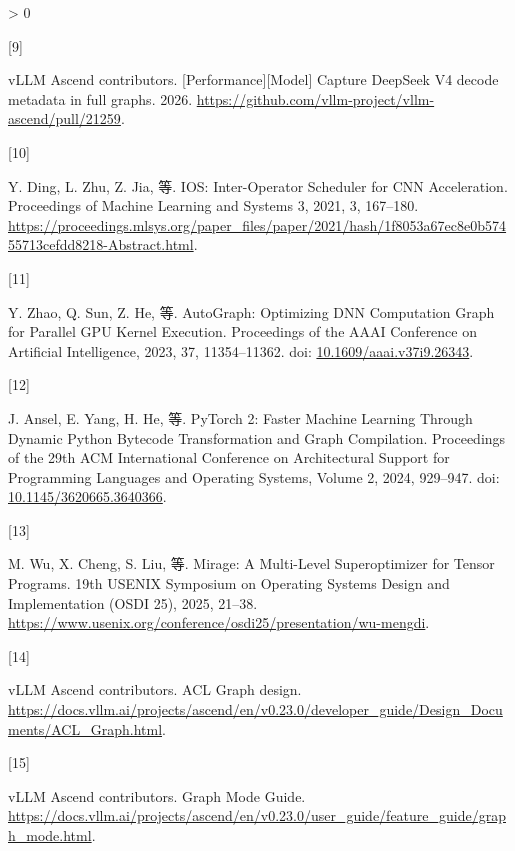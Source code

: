 \documentclass[
  UTF8,
  zihao=5]{ctexart}
\newlength{\cslhangindent}
\newlength{\csllabelwidth}
\newenvironment{CSLReferences}[2] %
 {%
  \setlength{\parindent}{0pt}
  \ifodd #1 \everypar{\setlength{\hangindent}{\cslhangindent}}\ignorespaces\fi
  \ifnum #2 > 0
  \setlength{\parskip}{#2\baselineskip}
  \fi
 }%
 {}
\newcommand{\CSLLeftMargin}[1]{\parbox[t]{\csllabelwidth}{#1}}
\newcommand{\CSLRightInline}[1]{\parbox[t]{\linewidth - \csllabelwidth}{#1}\par}
\begin{document}
\begin{CSLReferences}{0}{0}
\leavevmode{}%
\CSLLeftMargin{{[}9{]} }%
\CSLRightInline{vLLM Ascend contributors. {{[}Performance{]}{[}Model{]}
Capture DeepSeek V4 decode metadata in full graphs}. 2026.
\url{https://github.com/vllm-project/vllm-ascend/pull/21259}.}

\leavevmode{}%
\CSLLeftMargin{{[}10{]} }%
\CSLRightInline{Y. Ding, L. Zhu, Z. Jia, 等. IOS: Inter-Operator
Scheduler for CNN Acceleration. Proceedings of Machine Learning and
Systems 3, 2021, 3, 167--180.
\url{https://proceedings.mlsys.org/paper_files/paper/2021/hash/1f8053a67ec8e0b57455713cefdd8218-Abstract.html}.}

\leavevmode{}%
\CSLLeftMargin{{[}11{]} }%
\CSLRightInline{Y. Zhao, Q. Sun, Z. He, 等. AutoGraph: Optimizing DNN
Computation Graph for Parallel GPU Kernel Execution. Proceedings of the
AAAI Conference on Artificial Intelligence, 2023, 37, 11354--11362. doi:
\href{https://doi.org/10.1609/aaai.v37i9.26343}{10.1609/aaai.v37i9.26343}.}

\leavevmode{}%
\CSLLeftMargin{{[}12{]} }%
\CSLRightInline{J. Ansel, E. Yang, H. He, 等. PyTorch 2: Faster Machine
Learning Through Dynamic Python Bytecode Transformation and Graph
Compilation. Proceedings of the 29th ACM International Conference on
Architectural Support for Programming Languages and Operating Systems,
Volume 2, 2024, 929--947. doi:
\href{https://doi.org/10.1145/3620665.3640366}{10.1145/3620665.3640366}.}

\leavevmode{}%
\CSLLeftMargin{{[}13{]} }%
\CSLRightInline{M. Wu, X. Cheng, S. Liu, 等. Mirage: A Multi-Level
Superoptimizer for Tensor Programs. 19th USENIX Symposium on Operating
Systems Design and Implementation (OSDI 25), 2025, 21--38.
\url{https://www.usenix.org/conference/osdi25/presentation/wu-mengdi}.}

\leavevmode{}%
\CSLLeftMargin{{[}14{]} }%
\CSLRightInline{vLLM Ascend contributors. {ACL Graph design}.
\url{https://docs.vllm.ai/projects/ascend/en/v0.23.0/developer_guide/Design_Documents/ACL_Graph.html}.}

\leavevmode{}%
\CSLLeftMargin{{[}15{]} }%
\CSLRightInline{vLLM Ascend contributors. {Graph Mode Guide}.
\url{https://docs.vllm.ai/projects/ascend/en/v0.23.0/user_guide/feature_guide/graph_mode.html}.}


\end{CSLReferences}
\end{document}

